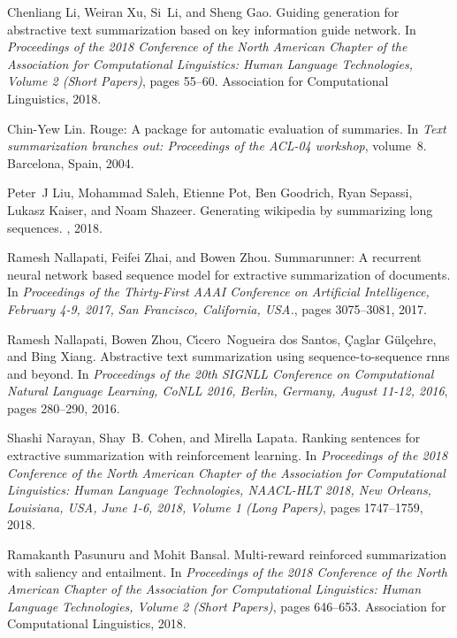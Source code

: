 \documentclass{article}
\begin{document}
\begin{thebibliography}{10}
Chenliang Li, Weiran Xu, Si~Li, and Sheng Gao.
\newblock Guiding generation for abstractive text summarization based on key
  information guide network.
\newblock In {\em Proceedings of the 2018 Conference of the North American
  Chapter of the Association for Computational Linguistics: Human Language
  Technologies, Volume 2 (Short Papers)}, pages 55--60. Association for
  Computational Linguistics, 2018.

Chin-Yew Lin.
\newblock Rouge: A package for automatic evaluation of summaries.
\newblock In {\em Text summarization branches out: Proceedings of the ACL-04
  workshop}, volume~8. Barcelona, Spain, 2004.

Peter~J Liu, Mohammad Saleh, Etienne Pot, Ben Goodrich, Ryan Sepassi, Lukasz
  Kaiser, and Noam Shazeer.
\newblock Generating wikipedia by summarizing long sequences.
, 2018.

Ramesh Nallapati, Feifei Zhai, and Bowen Zhou.
\newblock Summarunner: {A} recurrent neural network based sequence model for
  extractive summarization of documents.
\newblock In {\em Proceedings of the Thirty-First {AAAI} Conference on
  Artificial Intelligence, February 4-9, 2017, San Francisco, California,
  {USA.}}, pages 3075--3081, 2017.

Ramesh Nallapati, Bowen Zhou, C{\'{\i}}cero~Nogueira dos Santos, {\c{C}}aglar
  G{\"{u}}l{\c{c}}ehre, and Bing Xiang.
\newblock Abstractive text summarization using sequence-to-sequence rnns and
  beyond.
\newblock In {\em Proceedings of the 20th {SIGNLL} Conference on Computational
  Natural Language Learning, CoNLL 2016, Berlin, Germany, August 11-12, 2016},
  pages 280--290, 2016.

Shashi Narayan, Shay~B. Cohen, and Mirella Lapata.
\newblock Ranking sentences for extractive summarization with reinforcement
  learning.
\newblock In {\em Proceedings of the 2018 Conference of the North American
  Chapter of the Association for Computational Linguistics: Human Language
  Technologies, {NAACL-HLT} 2018, New Orleans, Louisiana, USA, June 1-6, 2018,
  Volume 1 (Long Papers)}, pages 1747--1759, 2018.

Ramakanth Pasunuru and Mohit Bansal.
\newblock Multi-reward reinforced summarization with saliency and entailment.
\newblock In {\em Proceedings of the 2018 Conference of the North American
  Chapter of the Association for Computational Linguistics: Human Language
  Technologies, Volume 2 (Short Papers)}, pages 646--653. Association for
  Computational Linguistics, 2018.


\end{thebibliography}
\end{document}
